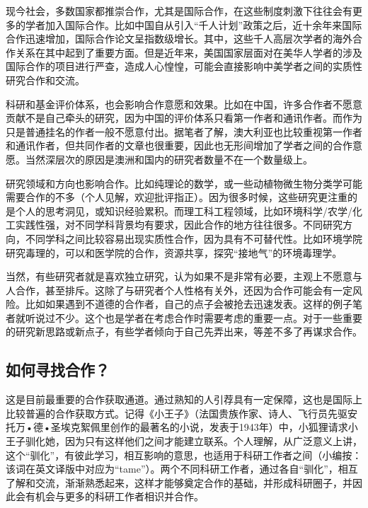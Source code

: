 \documentclass[]{book}
\begin{document}
现今社会，多数国家都推崇合作，尤其是国际合作，在这些制度刺激下往往会有更多的学者加入国际合作。比如中国自从引入``千人计划''政策之后，近十余年来国际合作迅速增加，国际合作论文呈指数级增长。其中，这些千人高层次学者的海外合作关系在其中起到了重要方面。但是近年来，美国国家层面对在美华人学者的涉及国际合作的项目进行严查，造成人心惶惶，可能会直接影响中美学者之间的实质性研究合作和交流。

科研和基金评价体系，也会影响合作意愿和效果。比如在中国，许多合作者不愿意贡献不是自己牵头的研究，因为中国的评价体系只看第一作者和通讯作者。而作为只是普通挂名的作者一般不愿意付出。据笔者了解，澳大利亚也比较重视第一作者和通讯作者，但共同作者的文章也很重要，因此也无形间增加了学者之间的合作意愿。当然深层次的原因是澳洲和国内的研究者数量不在一个数量级上。

研究领域和方向也影响合作。比如纯理论的数学，或一些动植物微生物分类学可能需要合作的不多（个人见解，欢迎批评指正）。因为很多时候，这些研究更注重的是个人的思考洞见，或知识经验累积。而理工科工程领域，比如环境科学/农学/化工实践性强，对不同学科背景均有要求，因此合作的地方往往很多。不同研究方向，不同学科之间比较容易出现实质性合作，因为具有不可替代性。比如环境学院研究毒理的，可以和医学院的合作，资源共享，探究``接地气''的环境毒理学。

当然，有些研究者就是喜欢独立研究，认为如果不是非常有必要，主观上不愿意与人合作，甚至排斥。这除了与研究者个人性格有关外，还因为合作可能会有一定风险。比如如果遇到不道德的合作者，自己的点子会被抢去迅速发表。这样的例子笔者就听说过不少。这个也是学者在考虑合作时需要考虑的重要一点。对于一些重要的研究新思路或新点子，有些学者倾向于自己先弄出来，等差不多了再谋求合作。

\hypertarget{ux5982ux4f55ux5bfbux627eux5408ux4f5c}{%
\subsection{如何寻找合作？}\label{ux5982ux4f55ux5bfbux627eux5408ux4f5c}}

这是目前最重要的合作获取通道。通过熟知的人引荐具有一定保障，这也是国际上比较普遍的合作获取方式。记得《小王子》（法国贵族作家、诗人、飞行员先驱安托万•德•圣埃克絮佩里创作的最著名的小说，发表于1943年）中，小狐狸请求小王子驯化她，因为只有这样他们之间才能建立联系。个人理解，从广泛意义上讲，这个``驯化''，有彼此学习，相互影响的意思，也适用于科研工作者之间（小编按：该词在英文译版中对应为``tame''）。两个不同科研工作者，通过各自``驯化''，相互了解和交流，渐渐熟悉起来，这样才能够奠定合作的基础，并形成科研圈子，并因此会有机会与更多的科研工作者相识并合作。
\end{document}
